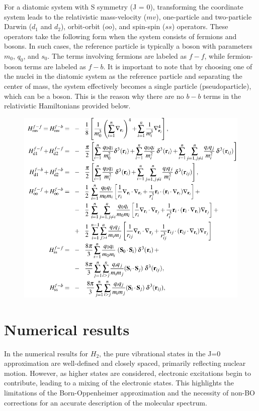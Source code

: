 \documentclass[%
 reprint,
 amsmath,amssymb,
 aps,
]{revtex4-2}
\begin{document}
For a diatomic system with S symmetry (J = 0), transforming the coordinate system leads to the relativistic mass-velocity (\(mv\)), one-particle and two-particle Darwin (\(d_1\) and \(d_2\)), orbit-orbit (\(oo\)), and spin-spin (\(ss\)) operators. These operators take the following form when the system consists of fermions and bosons. In such cases, the reference particle is typically a boson with parameters \(m_0\), \(q_0\), and \(s_0\). The terms involving fermions are labeled as \(f-f\), while fermion-boson terms are labeled as \(f-b\). It is important to note that by choosing one of the nuclei in the diatomic system as the reference particle and separating the center of mass, the system effectively becomes a single particle (pseudoparticle), which can be a boson. This is the reason why there are no \(b-b\) terms in the relativistic Hamiltonians provided below.\\

\begin{figure}[H]
    \centering
    \includegraphics[width=1.1\linewidth]{Hre.png}
\end{figure}

\section{Numerical results}
In the numerical results for $H_2$, the pure vibrational states in the J=0 approximation are well-defined and closely spaced, primarily reflecting nuclear motion. However, as higher states are considered, electronic excitations begin to contribute, leading to a mixing of the electronic states. This highlights the limitations of the Born-Oppenheimer approximation and the necessity of non-BO corrections for an accurate description of the molecular spectrum.
\end{document}
